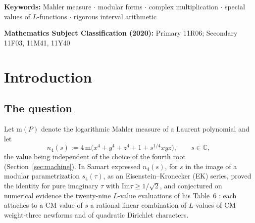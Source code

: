 \documentclass[11pt]{article}
\newcommand{\m}{\mathrm{m}}                 %
\newcommand{\Cc}{\mathbb{C}}
\newcommand{\ImT}{\mathrm{Im}}
\theoremstyle{definition}
\theoremstyle{remark}
\begin{document}
\begin{abstract}
cross-checks; all certification scripts are public. Beyond Table~6,
the evaluation track of the machine produces six new identities at
Heegner points (discriminants $D=11,19,27,43,67,163$), stated as
conjectures with $60$-digit evidence and exact lattice-derived
coefficients; they require a new ray-class constant type outside
Samart's library. We close with an umbrella conjecture (a CM
specialization conjecture with discriminant structure, and a
Tamagawa-controlled denominator conjecture) organizing the twelve
proved and six conjectured identities. Finally we score
the five remaining open entries of Table~6 against the machine's five
stations: all five are blocked by genuine obstructions --- a
two-dimensional critical image or a wrong-sheet
Eisenstein--Kronecker series ---
which we analyze precisely.
\end{abstract}

\medskip
\noindent\textbf{Keywords:} Mahler measure $\cdot$ modular forms
$\cdot$ complex multiplication $\cdot$ special values of
$L$-functions $\cdot$ rigorous interval arithmetic

\medskip
\noindent\textbf{Mathematics Subject Classification (2020):}
Primary 11R06; Secondary 11F03, 11M41, 11Y40

\section{Introduction}\label{sec:intro}

\subsection{The question}

Let $\m(P)$ denote the logarithmic Mahler measure of a Laurent
polynomial and let
\[
  n_4(s):=4\,\m\bigl(x^4+y^4+z^4+1+s^{1/4}xyz\bigr),\qquad s\in\Cc,
\]
the value being independent of the choice of the fourth root
(Section~\ref{sec:machine}). In \cite{Sa13,Sa15} Samart expressed
$n_4(s)$, for $s$ in the image of a modular parametrization
$s_4(\tau)$, as an Eisenstein--Kronecker (EK) series, proved the
identity for pure imaginary $\tau$ with $\ImT\tau\ge1/\sqrt2$, and
conjectured on numerical evidence the twenty-nine $L$-value
evaluations of his Table~6 \cite{Sa15}: each attaches to a CM value
of $s$ a rational linear combination of $L$-values of CM weight-three
newforms and of quadratic Dirichlet characters.
\end{document}

